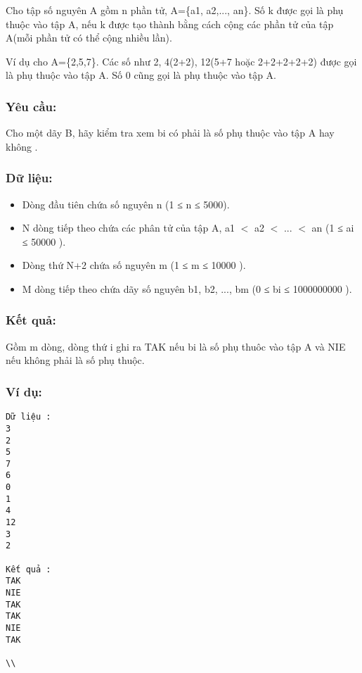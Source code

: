 



   Cho tập số nguyên A gồm n phần tử, A=\{a1, a2,..., an\}. Số k được gọi là phụ thuộc vào tập A, nếu k được tạo thành bằng cách cộng các phần tử của tập A(mỗi phần tử có thể cộng nhiều lần).  

   Ví dụ  cho A=\{2,5,7\}.  Các số như 2, 4(2+2), 12(5+7 hoặc 2+2+2+2+2) được gọi là phụ thuộc vào tập A. Số 0 cũng gọi là phụ thuộc vào tập A.  

\subsubsection{   Yêu cầu:  }

   Cho một dãy B, hãy kiểm tra xem bi có phải là số phụ thuộc vào tập A hay không .  

\subsubsection{   Dữ liệu:  }
\begin{itemize}
	\item     Dòng đầu tiên chứa số nguyên n (1 ≤ n ≤ 5000).   
	\item     N dòng tiếp theo chứa các phân tử của tập A, a1 $<$ a2 $<$ ... $<$ an  (1  ≤ ai  ≤ 50000 ).   
	\item     Dòng thứ N+2 chứa số nguyên m (1 ≤ m ≤ 10000 ).   
	\item     M dòng tiếp theo chứa dãy số nguyên b1, b2, ..., bm (0 ≤ bi ≤ 1000000000 ).   
\end{itemize}

\subsubsection{   Kết quả:  }

   Gồm m dòng, dòng thứ i ghi ra TAK nếu bi là số phụ thuôc vào tập A và NIE nếu không phải là số phụ thuộc.  

\subsubsection{   Ví dụ:  }
\begin{verbatim}
Dữ liệu :
3
2
5
7
6
0
1
4
12
3
2

Kết quả :
TAK
NIE
TAK
TAK
NIE
TAK

\\\end{verbatim}